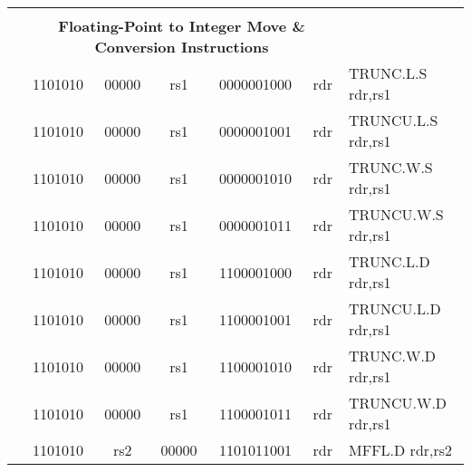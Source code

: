 \begin{table}[p]
\begin{small}
\begin{center}
\begin{tabular}{rcccccccccl}
&
\multicolumn{9}{c}{} & \\
&
\multicolumn{9}{c}{\bf Floating-Point to Integer Move \& Conversion Instructions} & \\
\cline{2-10}
  

&
\multicolumn{2}{|c|}{1101010} &
\multicolumn{1}{c|}{00000} &
\multicolumn{1}{c|}{rs1} &
\multicolumn{4}{c|}{0000001000} &
\multicolumn{1}{c|}{rdr} & TRUNC.L.S rdr,rs1 \\
\cline{2-10}
  

&
\multicolumn{2}{|c|}{1101010} &
\multicolumn{1}{c|}{00000} &
\multicolumn{1}{c|}{rs1} &
\multicolumn{4}{c|}{0000001001} &
\multicolumn{1}{c|}{rdr} & TRUNCU.L.S rdr,rs1 \\
\cline{2-10}
  

&
\multicolumn{2}{|c|}{1101010} &
\multicolumn{1}{c|}{00000} &
\multicolumn{1}{c|}{rs1} &
\multicolumn{4}{c|}{0000001010} &
\multicolumn{1}{c|}{rdr} & TRUNC.W.S rdr,rs1 \\
\cline{2-10}
  

&
\multicolumn{2}{|c|}{1101010} &
\multicolumn{1}{c|}{00000} &
\multicolumn{1}{c|}{rs1} &
\multicolumn{4}{c|}{0000001011} &
\multicolumn{1}{c|}{rdr} & TRUNCU.W.S rdr,rs1 \\
\cline{2-10}
  

&
\multicolumn{2}{|c|}{1101010} &
\multicolumn{1}{c|}{00000} &
\multicolumn{1}{c|}{rs1} &
\multicolumn{4}{c|}{1100001000} &
\multicolumn{1}{c|}{rdr} & TRUNC.L.D rdr,rs1 \\
\cline{2-10}
  

&
\multicolumn{2}{|c|}{1101010} &
\multicolumn{1}{c|}{00000} &
\multicolumn{1}{c|}{rs1} &
\multicolumn{4}{c|}{1100001001} &
\multicolumn{1}{c|}{rdr} & TRUNCU.L.D rdr,rs1 \\
\cline{2-10}
  

&
\multicolumn{2}{|c|}{1101010} &
\multicolumn{1}{c|}{00000} &
\multicolumn{1}{c|}{rs1} &
\multicolumn{4}{c|}{1100001010} &
\multicolumn{1}{c|}{rdr} & TRUNC.W.D rdr,rs1 \\
\cline{2-10}
  

&
\multicolumn{2}{|c|}{1101010} &
\multicolumn{1}{c|}{00000} &
\multicolumn{1}{c|}{rs1} &
\multicolumn{4}{c|}{1100001011} &
\multicolumn{1}{c|}{rdr} & TRUNCU.W.D rdr,rs1 \\
\cline{2-10}
  

&
\multicolumn{2}{|c|}{1101010} &
\multicolumn{1}{c|}{rs2} &
\multicolumn{1}{c|}{00000} &
\multicolumn{4}{c|}{1101011001} &
\multicolumn{1}{c|}{rdr} & MFFL.D rdr,rs2 \\
\cline{2-10}
  


\end{tabular}
\end{center}
\end{small}
\end{table}
